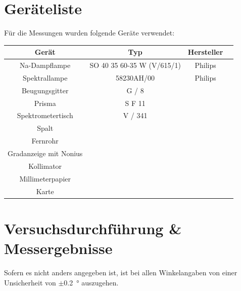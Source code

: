 \documentclass[11pt,ngerman]{scrartcl}
\begin{document}
\section{Geräteliste}

\noindent Für die Messungen wurden folgende Geräte verwendet:

\begin{center}
	\begin{tabular}{|c|c|c|c|} \hline
		\textbf{Gerät}         & \textbf{Typ}               & \textbf{Hersteller} \\ \hline

		Na-Dampflampe          & SO 40 35 60-35 W (V/615/1) & Philips             \\ \hline
		Spektrallampe          & 58230AH/00                 & Philips             \\ \hline
		Beugungsgitter         & G / 8                      &                     \\ \hline
		Prisma                 & S F 11                     &                     \\ \hline
		Spektrometertisch      & V / 341                    &                     \\ \hline
		Spalt                  &                            &                     \\ \hline
		Fernrohr               &                            &                     \\ \hline
		Gradanzeige mit Nonius &                            &                     \\ \hline
		Kollimator             &                            &                     \\ \hline
		Millimeterpapier       &                            &                     \\ \hline
		Karte                  &                            &                     \\ \hline
	\end{tabular}
\end{center}



\section{Versuchsdurchführung \& Messergebnisse}\label{sec:Versuchsdurchführung}

Sofern es nicht anders angegeben ist, ist bei allen Winkelangaben von einer Unsicherheit von
$\pm$\SI{0.2}{\degree} auszugehen.
\end{document}
